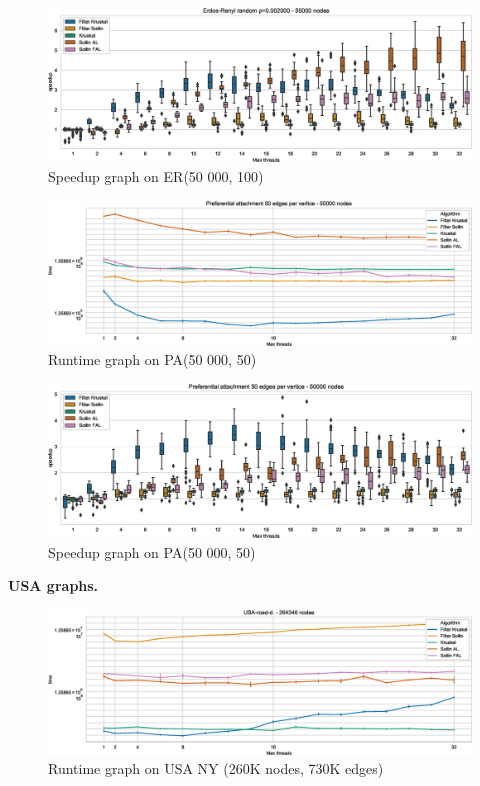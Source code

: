 \documentclass[letterpaper]{article}
\newcommand{\mypar}[1]{{\bf #1.}}
\begin{document}
\begin{figure}\centering
  \includegraphics[width=\linewidth]{graphics/Box_Speedup_Erdos-Renyi_random_p=0.002000_50000.eps}
  \caption{Speedup graph on ER(50 000, 100)\label{sparseERspeedup}}
\end{figure}

\begin{figure}\centering
  \includegraphics[width=\linewidth]{graphics/Graph_runtime_Preferential_attachment_50_edges_per_vertice_50000.eps}
  \caption{Runtime graph on PA(50 000, 50)\label{sparsePAruntime}}
\end{figure}

\begin{figure}\centering
  \includegraphics[width=\linewidth]{graphics/Box_Speedup_Preferential_attachment_50_edges_per_vertice_50000.eps}
  \caption{Speedup graph on PA(50 000, 50)\label{sparsePAspeedup}}
\end{figure}

\mypar{USA graphs}

\begin{figure}\centering
  \includegraphics[width=\linewidth]{graphics/Graph_runtime_USA-road-d._264346.eps}
  \caption{Runtime graph on USA NY (260K nodes, 730K edges)\label{usaNYruntime}}
\end{figure}
\end{document}
